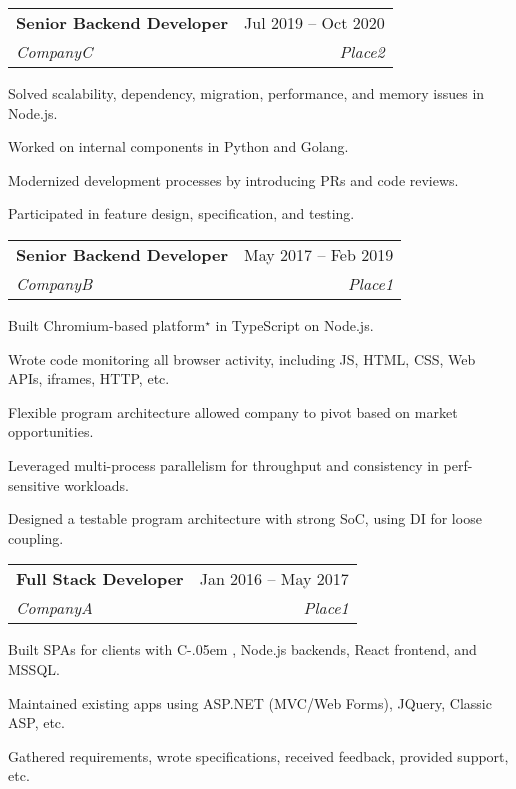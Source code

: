 \documentclass[a4paper,11pt]{article}
\makeatletter
\newcommand{\sharplang}[1]{%
    {\settoheight{\dimen0}{#1}#1\kern-.05em \resizebox{!}{\dimen0}{\raisebox{\depth}{\#}}}%
}
\newcommand{\placeblock}[4]{%
    \vspace{-2pt}\item%
    \begin{tabular*}{0.97\textwidth}[t]{l@{\extracolsep{\fill}}r}%
        \textbf{#1} & #2 \\%
        \textit{\small#3} & \textit{\small #4} \\%
    \end{tabular*}\vspace{-7pt}%
}%
\newenvironment*{place}[4]{%
    \placeblock{#1}{#2}{#3}{#4}
    \begin{itemList}
}{%
    \end{itemList}
}%
\newcommand{\eternitech}{Eternitech}
\newcommand{\reflectiz}{Reflectiz}
\newcommand{\appdome}{Appdome}
\newcommand{\ramatgan}{Ramat Gan, Israel}
\newcommand{\telaviv}{Tel Aviv}
\renewcommand{\eternitech}{CompanyA}
\renewcommand{\reflectiz}{CompanyB}
\renewcommand{\appdome}{CompanyC}
\renewcommand{\ramatgan}{Place1}
\renewcommand{\telaviv}{Place2}
\newenvironment{jobAppdome}{%
    \begin{place}{Senior Backend Developer}{Jul 2019 -- Oct 2020}{\appdome}{\telaviv}
}{
    \end{place}
}
\newenvironment{jobReflectizDev}{%
    \begin{place}
        {Senior Backend Developer}{May 2017 -- Feb 2019}
        {\reflectiz}{\ramatgan}
}{%
    \end{place}
}
\newenvironment{jobEternitech}{%
    \begin{place}{Full Stack Developer}{Jan 2016 -- May 2017}
        {\eternitech}{\ramatgan}%
}{%
    \end{place}
}
\makeatother
\begin{document}
\begin{sectionList}
    \begin{jobAppdome}
        \item Solved scalability, dependency, migration, performance, and memory issues in Node.js.
        \item Worked on internal components in Python and Golang.
        \item Modernized development processes by introducing PRs and code reviews.
        \item Participated in feature design, specification, and testing.
    \end{jobAppdome}

    \begin{jobReflectizDev}
        \item Built Chromium-based platform$^\star$ in TypeScript on Node.js.
        \item Wrote code monitoring all browser activity, including JS, HTML, CSS, Web APIs, iframes, HTTP, etc.
        \item Flexible program architecture allowed company to pivot based on market opportunities.
        \item Leveraged multi-process parallelism for throughput and consistency in perf-sensitive workloads.
        \item Designed a testable program architecture with strong SoC, using DI for loose coupling.
    \end{jobReflectizDev}
    \begin{jobEternitech}
        \item Built SPAs for clients with \sharplang{C}, Node.js backends, React frontend, and MSSQL.\@
        \item Maintained existing apps using ASP.NET (MVC/Web Forms), JQuery, Classic ASP, etc.
        \item Gathered requirements, wrote specifications, received feedback, provided support, etc.
    \end{jobEternitech}
\end{sectionList}%


\end{document}
